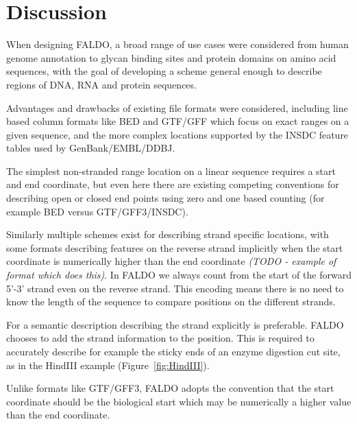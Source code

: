 \section*{Discussion}
When designing FALDO, a broad range of use cases were considered from
human genome annotation to glycan binding sites and protein domains on
amino acid sequences, with the goal of developing a scheme general enough
to describe regions of DNA, RNA and protein sequences.

Advantages and drawbacks of existing file formats were considered, including
line based column formats like BED and GTF/GFF which focus on exact
ranges on a given sequence, and the more complex locations supported
by the INSDC feature tables used by GenBank/EMBL/DDBJ.

The simplest non-stranded range location on a linear sequence requires
a start and end coordinate, but even here there are existing competing
conventions for describing open or closed end points using zero and
one based counting (for example BED versus GTF/GFF3/INSDC).

Similarly multiple schemes exist for describing strand specific locations,
with some formats describing features on the reverse strand implicitly
when the start coordinate is numerically higher than the end coordinate
\textit{(TODO - example of format which does this)}.
In FALDO we always count from the start of the forward 5'-3' strand even on the reverse strand.
This encoding means there is no need to know the length of the sequence to compare positions on the different strands.

For a semantic description describing the strand explicitly is preferable.
FALDO chooses to add the strand information to the position. 
This is required to accurately describe for example the sticky ends
of an enzyme digestion cut site, as in the HindIII example (Figure~\ref{fig:HindIII}).

Unlike formats like GTF/GFF3, FALDO adopts the convention
that the start coordinate should be the biological start which 
may be numerically a higher value than the end coordinate.

